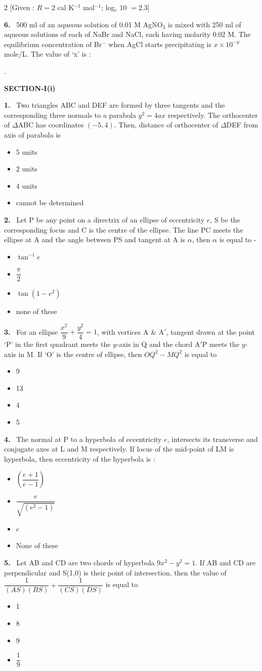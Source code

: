 \documentclass[10pt]{extarticle}
\newcommand{\partsec}[2]{\par\medskip\noindent{\large\bfseries PART-#1: #2}\par\smallskip}
\newcommand{\sect}[1]{\par\smallskip\noindent\textbf{#1}\par}
\newcommand{\qn}[1]{\par\smallskip\noindent\textbf{#1.}~}
\newenvironment{qoptions}{\begin{itemize}[leftmargin=1.8em,itemsep=1pt,topsep=2pt,label={}]}{\end{itemize}}
\newcommand{\opt}[2]{\item[(#1)] #2}
\begin{document}
\begin{multicols}{2}
[Given : $R=2$ cal K$^{-1}$ mol$^{-1}$; log$_e$ 10 $=2.3$]
\qn{6} 500 ml of an aqueous solution of 0.01 M AgNO$_3$ is mixed with 250 ml of aqueous solutions of each of NaBr and NaCl, each having molarity 0.02 M. The equilibrium concentration of Br$^-$ when AgCl starts precipitating is $x\times10^{-y}$ mole/L. The value of `x' is :\par
[Given $K_{sp}$ (AgBr) $=5\times10^{-13}$; $K_{sp}$ (AgCl) $=10^{-10}$].
\partsec{3}{MATHEMATICS}
\sect{SECTION-I(i)}
\qn{1} Two triangles ABC and DEF are formed by three tangents and the corresponding three normals to a parabola $y^2=4ax$ respectively. The orthocenter of $\Delta$ABC has coordinates $(-5,4)$. Then, distance of orthocenter of $\Delta$DEF from axis of parabola is
\begin{qoptions}
\opt{A}{5 units}
\opt{B}{2 units}
\opt{C}{4 units}
\opt{D}{cannot be determined}
\end{qoptions}
\qn{2} Let P be any point on a directrix of an ellipse of eccentricity $e$, S be the corresponding focus and C is the centre of the ellipse. The line PC meets the ellipse at A and the angle between PS and tangent at A is $\alpha$, then $\alpha$ is equal to -
\begin{qoptions}
\opt{A}{$\tan^{-1}e$}
\opt{B}{$\dfrac{\pi}{2}$}
\opt{C}{$\tan(1-e^2)$}
\opt{D}{none of these}
\end{qoptions}
\qn{3} For an ellipse $\dfrac{x^2}{9}+\dfrac{y^2}{4}=1$, with vertices A \& A$'$, tangent drawn at the point `P' in the first quadrant meets the $y$-axis in Q and the chord A$'$P meets the $y$-axis in M. If `O' is the centre of ellipse, then $OQ^2-MQ^2$ is equal to
\begin{qoptions}
\opt{A}{9}
\opt{B}{13}
\opt{C}{4}
\opt{D}{5}
\end{qoptions}
\qn{4} The normal at P to a hyperbola of eccentricity $e$, intersects its transverse and conjugate axes at L and M respectively. If locus of the mid-point of LM is hyperbola, then eccentricity of the hyperbola is :
\begin{qoptions}
\opt{A}{$\left(\dfrac{e+1}{e-1}\right)$}
\opt{B}{$\dfrac{e}{\sqrt{(e^2-1)}}$}
\opt{C}{$e$}
\opt{D}{None of these}
\end{qoptions}
\qn{5} Let AB and CD are two chords of hyperbola $9x^2-y^2=1$. If AB and CD are perpendicular and S(1,0) is their point of intersection, then the value of $\dfrac{1}{(AS)(BS)}+\dfrac{1}{(CS)(DS)}$ is equal to
\begin{qoptions}
\opt{A}{1}
\opt{B}{8}
\opt{C}{9}
\opt{D}{$\dfrac19$}
\end{qoptions}

\end{multicols}
\end{document}
